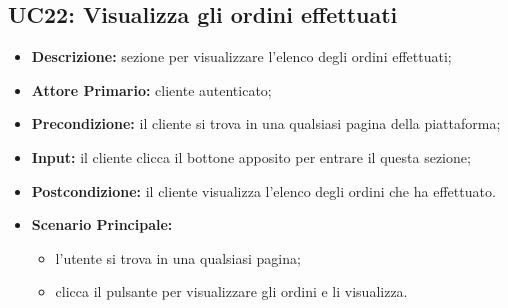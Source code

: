 \subsection{UC22: Visualizza gli ordini effettuati}
\label{sec:UC22}
\begin{itemize}
    \item \textbf{Descrizione:} sezione per visualizzare l'elenco degli ordini effettuati;
    \item \textbf{Attore Primario:} cliente autenticato;
    \item \textbf{Precondizione:} il cliente si trova in una qualsiasi pagina della piattaforma;
    \item \textbf{Input:} il cliente clicca il bottone apposito per entrare il questa sezione;
    \item \textbf{Postcondizione:} il cliente visualizza l'elenco degli ordini che ha effettuato.
    \item \textbf{Scenario Principale:}
    \begin{itemize}
        \item l'utente si trova in una qualsiasi pagina;
        \item clicca il pulsante per visualizzare gli ordini e li visualizza.
    \end{itemize}
\end{itemize}